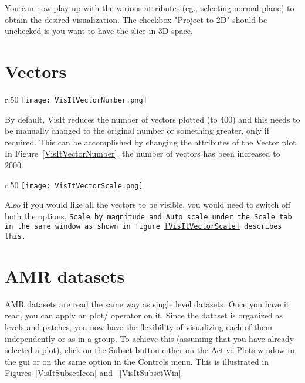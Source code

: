 You can now play up with the various attributes (eg., selecting normal
plane) to obtain the desired visualization. The checkbox "Project to
2D" should be unchecked is you want to have the slice in 3D space.

\section{Vectors}

\begin{wrapfigure}{r}{.50\textwidth}
  \center
  \vspace{-40pts}
  \texttt{[image: VisItVectorNumber.png]}
  \caption{Increasing the number of Vectors}
  \vspace{-20pts}
  \label{VisItVectorNumber}
\end{wrapfigure}


By default, VisIt reduces the number of vectors plotted (to 400) and
this needs to be manually changed to the original number or something
greater, only if required.  This can be accomplished by changing the
attributes of the Vector plot. In Figure~\ref{VisItVectorNumber}, the
number of vectors has been increased to 2000.


\begin{wrapfigure}{r}{.50\textwidth}
  \center
  \vspace{-50pts}
  \texttt{[image: VisItVectorScale.png]}
  \caption{Increasing the scale of Vectors}
  \vspace{-30pts}
  \label{VisItVectorScale}
\end{wrapfigure}


Also if you would like all the vectors to be visible, you would need
to switch off both the options, \tt Scale by magnitude \normalfont and
\tt Auto scale \normalfont under the Scale tab in the same window as
shown in figure~\ref{VisItVectorScale} describes this.


\section{AMR datasets}



AMR datasets are read the same way as single level datasets. Once you
have it read, you can apply an plot/ operator on it. Since the dataset
is organized as levels and patches, you now have the flexibility of
visualizing each of them independently or as in a group. To achieve
this (assuming that you have already selected a plot), click on the
Subset button either on the Active Plots window in the gui or on the
same option in the Controls menu. This is illustrated in
Figures~\ref{VisItSubsetIcon} and ~\ref{VisItSubsetWin}.

